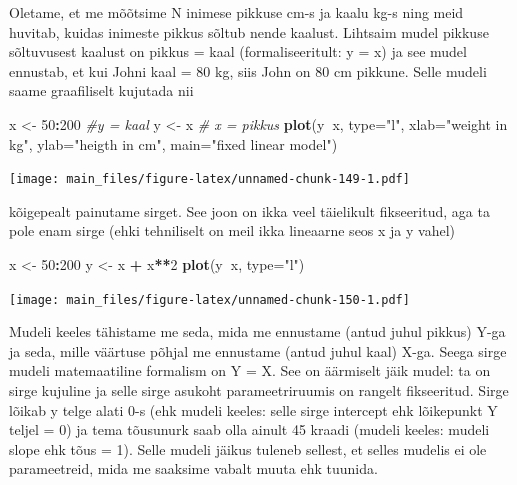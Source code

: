 \documentclass[]{book}
\newenvironment{Shaded}{\begin{snugshade}}{\end{snugshade}}
\newcommand{\KeywordTok}[1]{\textcolor[rgb]{0.13,0.29,0.53}{\textbf{#1}}}
\newcommand{\DataTypeTok}[1]{\textcolor[rgb]{0.13,0.29,0.53}{#1}}
\newcommand{\DecValTok}[1]{\textcolor[rgb]{0.00,0.00,0.81}{#1}}
\newcommand{\StringTok}[1]{\textcolor[rgb]{0.31,0.60,0.02}{#1}}
\newcommand{\CommentTok}[1]{\textcolor[rgb]{0.56,0.35,0.01}{\textit{#1}}}
\newcommand{\OperatorTok}[1]{\textcolor[rgb]{0.81,0.36,0.00}{\textbf{#1}}}
\newcommand{\NormalTok}[1]{#1}
\begin{document}
Oletame, et me mõõtsime N inimese pikkuse cm-s ja kaalu kg-s ning meid
huvitab, kuidas inimeste pikkus sõltub nende kaalust. Lihtsaim mudel
pikkuse sõltuvusest kaalust on pikkus = kaal (formaliseeritult: y = x)
ja see mudel ennustab, et kui Johni kaal = 80 kg, siis John on 80 cm
pikkune. Selle mudeli saame graafiliselt kujutada nii

\begin{Shaded}
\begin{Highlighting}[]
\NormalTok{x <-}\StringTok{ }\DecValTok{50}\OperatorTok{:}\DecValTok{200} \CommentTok{#y = kaal}
\NormalTok{y <-}\StringTok{ }\NormalTok{x }\CommentTok{# x = pikkus }
\KeywordTok{plot}\NormalTok{(y}\OperatorTok{~}\NormalTok{x, }\DataTypeTok{type=}\StringTok{"l"}\NormalTok{, }\DataTypeTok{xlab=}\StringTok{"weight in kg"}\NormalTok{, }\DataTypeTok{ylab=}\StringTok{"heigth in cm"}\NormalTok{, }\DataTypeTok{main=}\StringTok{"fixed linear model"}\NormalTok{)}
\end{Highlighting}
\end{Shaded}

\texttt{[image: main\_files/figure-latex/unnamed-chunk-149-1.pdf]}

kõigepealt painutame sirget. See joon on ikka veel täielikult
fikseeritud, aga ta pole enam sirge (ehki tehniliselt on meil ikka
lineaarne seos x ja y vahel)

\begin{Shaded}
\begin{Highlighting}[]
\NormalTok{x <-}\StringTok{ }\DecValTok{50}\OperatorTok{:}\DecValTok{200}
\NormalTok{y <-}\StringTok{ }\NormalTok{x }\OperatorTok{+}\StringTok{ }\NormalTok{x}\OperatorTok{**}\DecValTok{2}
\KeywordTok{plot}\NormalTok{(y}\OperatorTok{~}\NormalTok{x, }\DataTypeTok{type=}\StringTok{"l"}\NormalTok{)}
\end{Highlighting}
\end{Shaded}

\texttt{[image: main\_files/figure-latex/unnamed-chunk-150-1.pdf]}

Mudeli keeles tähistame me seda, mida me ennustame (antud juhul pikkus)
Y-ga ja seda, mille väärtuse põhjal me ennustame (antud juhul kaal)
X-ga. Seega sirge mudeli matemaatiline formalism on Y = X. See on
äärmiselt jäik mudel: ta on sirge kujuline ja selle sirge asukoht
parameetriruumis on rangelt fikseeritud. Sirge lõikab y telge alati 0-s
(ehk mudeli keeles: selle sirge intercept ehk lõikepunkt Y teljel = 0)
ja tema tõusunurk saab olla ainult 45 kraadi (mudeli keeles: mudeli
slope ehk tõus = 1). Selle mudeli jäikus tuleneb sellest, et selles
mudelis ei ole parameetreid, mida me saaksime vabalt muuta ehk tuunida.
\end{document}
